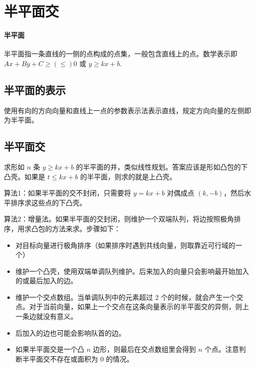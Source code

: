\section{半平面交}
\paragraph{半平面} 半平面指一条直线的一侧的点构成的点集，一般包含直线上的点。数学表示即 $Ax+By+C \ge(\le) 0$ 或 $y \ge kx + b$.

\subsection{半平面的表示}
使用有向的方向向量和直线上一点的参数表示法表示直线，规定方向向量的左侧即为半平面。

\subsection{半平面交}
求形如 $n$ 条 $y \ge kx + b$ 的半平面的并，类似线性规划。答案应该是形如凸包的下凸壳。如果是 $t \le kx +b$ 的半平面，则求的就是上凸壳。

\noindent 算法1：如果半平面的交不封闭，只需要将 $y=kx+b$ 对偶成点 $(k, -b)$，然后水平排序求这些点的下凸壳。

\noindent 算法2：增量法。如果半平面的交封闭，则维护一个双端队列，将边按照极角排序，用求凸包的方法来求。步骤如下：

\begin{itemize}
    \item 对目标向量进行极角排序（如果排序时遇到共线向量，则取靠近可行域的一个）
    \item 维护一个凸壳，使用双端单调队列维护。后来加入的向量只会影响最开始加入的或最后加入的边。
    \item 维护一个交点数组。当单调队列中的元素超过 2 个的时候，就会产生一个交点。对于当前向量，如果上一个交点在这条向量表示的半平面交的异侧，则上一条边就没有意义。
    \item 后加入的边也可能会影响队首的边。
    \item 如果半平面交是一个凸 $n$ 边形，则最后在交点数组里会得到 $n$ 个点。注意判断半平面交不存在或面积为 0 的情况。
\end{itemize}


